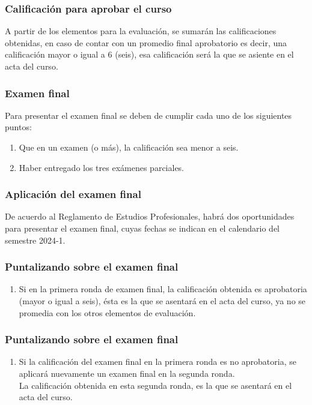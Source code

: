 \documentclass[12pt]{beamer}
\begin{document}
\begin{frame}
\frametitle{Calificación para aprobar el curso}
A partir de los elementos para la evaluación, se sumarán las calificaciones obtenidas, en caso de contar con un promedio final aprobatorio  es decir, una calificación mayor o igual a $6$ (seis), \pause esa calificación será la que se asiente en el acta del curso.
\end{frame}
\begin{frame}
\frametitle{Examen final}
Para presentar el examen final se deben de cumplir cada uno de los siguientes puntos:
\begin{enumerate}[<+->]
\item Que en un examen (o más), la calificación sea menor a seis. %
\item Haber entregado los tres exámenes parciales.
\end{enumerate}
\end{frame}
\begin{frame}
\frametitle{Aplicación del examen final}
De acuerdo al Reglamento de Estudios Profesionales, habrá dos oportunidades para presentar el examen final, cuyas fechas se indican en el calendario del semestre 2024-1.
\end{frame}
\begin{frame}
\frametitle{Puntalizando sobre el examen final}
\begin{enumerate}[<+->]
\item Si en la primera ronda de examen final, la calificación obtenida es aprobatoria (mayor o igual a seis), ésta es la que se asentará en el acta del curso, ya no se promedia con los otros elementos de evaluación.
\seti
\end{enumerate}
\end{frame}
\begin{frame}
\frametitle{Puntalizando sobre el examen final}
\begin{enumerate}[<+->]
\conti    
\item Si la calificación del examen final en la primera ronda es no aprobatoria, se aplicará nuevamente un examen final en la segunda ronda. 
\\
\bigskip
\pause
La calificación obtenida en esta segunda ronda, es la que se asentará en el acta del curso.
\seti
\end{enumerate}
\end{frame}
\end{document}
